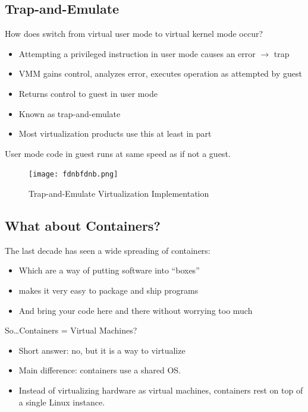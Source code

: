 \subsection{Trap-and-Emulate}
How does switch from virtual user mode to virtual kernel mode occur?

\begin{itemize}
    \item Attempting a privileged instruction in user mode causes an error $\to$ trap
    \item VMM gains control, analyzes error, executes operation as attempted by guest
    \item Returns control to guest in user mode
    \item Known as trap-and-emulate
    \item Most virtualization products use this at least in part
\end{itemize}

User mode code in guest runs at same speed as if not a guest.

\begin{figure}[h!]
    \centering
    \texttt{[image: fdnbfdnb.png]}
    \caption{Trap-and-Emulate Virtualization Implementation}
\end{figure}
\newpage
\subsection{What about Containers?}

The last decade has seen a wide spreading of containers:

\begin{itemize}
    \item Which are a way of putting software into “boxes”
    \item makes it very easy to package and ship programs
    \item And bring your code here and there without worrying too much
\end{itemize}

So\dots Containers = Virtual Machines?

\begin{itemize}
    \item[] Short answer: no, but it is a way to virtualize
    \item[] Main difference: containers use a shared OS.
    \item[] Instead of virtualizing hardware as virtual machines, containers rest on top of a single Linux instance.
\end{itemize}

